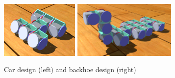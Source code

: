 \documentclass[graybox]{svmult}
\begin{document}
%
\begin{figure}
\begin{center}
    \includegraphics[height=1.1in]{images/library/unity/car.png}
    \includegraphics[height=1.1in]{images/library/unity/backhoe.png}
    \caption{Car design (left) and backhoe design (right)}
    \label{fig:car-and-backhoe}
\end{center}
\end{figure} 
\end{document}

